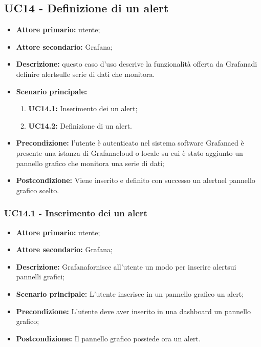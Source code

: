 \documentclass[a4]{article}
\begin{document}
	\subsection{UC14 - Definizione di un alert}
	\begin{itemize}
		\item \textbf{Attore primario:} utente;
		\item \textbf{Attore secondario:} Grafana\glo;
		\item \textbf{Descrizione:} questo caso d'uso descrive la funzionalità offerta da Grafana\glo di definire alert\glosp sulle serie di dati che monitora.
		\item \textbf{Scenario principale:} 
		\begin{enumerate}
			\item \textbf{UC14.1:} Inserimento dei un alert\glo;
			\item \textbf{UC14.2:} Definizione di un alert\glo.
		\end{enumerate}
		\item \textbf{Precondizione:} l'utente è autenticato nel sistema software Grafana\glo ed è presente una istanza di Grafana\glo cloud o locale su cui è stato aggiunto un pannello grafico che monitora una serie di dati;
		\item \textbf{Postcondizione:} Viene inserito e definito con successo un alert\glosp nel pannello grafico scelto.
	\end{itemize}
	
	\subsubsection{UC14.1 - Inserimento dei un alert}
	\begin{itemize}
		\item \textbf{Attore primario:} utente;
		\item \textbf{Attore secondario:} Grafana\glo;
		\item \textbf{Descrizione:} Grafana\glo fornisce all'utente un modo per inserire alert\glosp sui pannelli grafici;
		\item \textbf{Scenario principale:} L'utente inserisce in un pannello grafico un alert\glo;
		\item \textbf{Precondizione:} L'utente deve aver inserito in una dashboard un pannello grafico;
		\item \textbf{Postcondizione:} Il pannello grafico possiede ora un alert\glo.
	\end{itemize}
	
\end{document}
